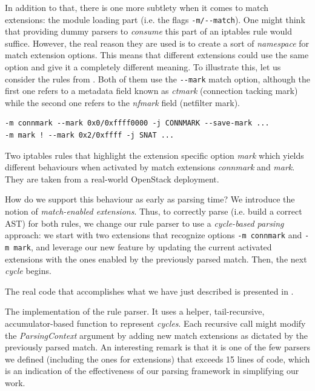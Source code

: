 In addition to that, there is one more subtlety when it comes to match
extensions: the module loading part (i.e. the flags \lstinline{-m/--match}).
One might think that providing dummy parsers to \emph{consume} this part of an
iptables rule would suffice.  However, the real reason they are used is to
create a sort of \emph{namespace} for match extension options.  This means that
different extensions could use the same option and give it a completely
different meaning.  To illustrate this, let us consider the rules from
.  Both of them use the
\lstinline{--mark} match option, although the first one refers to a metadata
field known as \emph{ctmark} (connection tacking mark) while the second one
refers to the \emph{nfmark} field (netfilter mark).

\begin{listing}
  \lstset{numbers=none, frame=single, basicstyle=\ttfamily,
    xleftmargin=0.05\textwidth, xrightmargin=0.05\textwidth
  }
  \small
  \begin{lstlisting}
-m connmark --mark 0x0/0xffff0000 -j CONNMARK --save-mark ...
-m mark ! --mark 0x2/0xffff -j SNAT ...
  \end{lstlisting}
  \caption{Two iptables rules that highlight the extension specific option
  \emph{mark} which yields different behaviours when activated by match
  extensions \emph{connmark} and \emph{mark}.  They are taken from a real-world
  OpenStack deployment.}
  \label{lst:namespace-example}
\end{listing}

How do we support this behaviour as early as parsing time?  We introduce the
notion of \emph{match-enabled extensions}.  Thus, to correctly parse (i.e.
build a correct AST) for both rules, we change our rule parser to use a
\emph{cycle-based parsing} approach: we start with two extensions that
recognize options \lstinline{-m connmark} and \lstinline{-m mark}, and leverage
our new feature by updating the current activated extensions with the ones
enabled by the previously parsed match.  Then, the next \emph{cycle} begins.

The real code that accomplishes what we have just described is presented in
.

\begin{listing}[H]
  \caption{The implementation of the rule parser.  It uses a helper,
  tail-recursive, accumulator-based function to represent \emph{cycles}.  Each
  recursive call might modify the \emph{ParsingContext} argument by adding new
  match extensions as dictated by the previously parsed match.  An interesting
  remark is that it is one of the few parsers we defined (including the ones
  for extensions) that exceeds 15 lines of code, which is an indication of the
  effectiveness of our parsing framework in simplifying our work.}
  \label{lst:rule-parser}
\end{listing}


